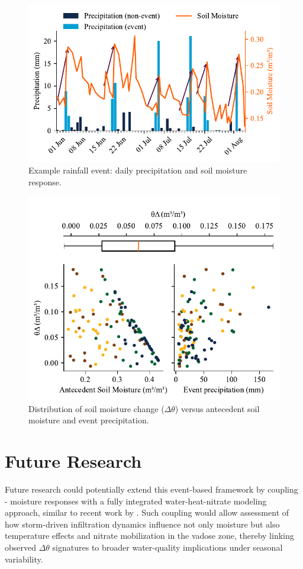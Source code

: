 \documentclass[8pt, twocolumn]{extarticle}
\begin{document}
\begin{figure}[!htbp]
    \centering
    \includegraphics[width=\columnwidth]{sample events}
    \caption{Example rainfall event: daily precipitation and soil moisture response.}
    \label{fig:sample_events}
\end{figure}

\begin{figure}[!htbp]
    \centering
    \includegraphics[width=\columnwidth]{dt events}
    \caption{Distribution of soil moisture change ($\Delta \theta$) versus antecedent soil moisture and event precipitation.}
    \label{fig:dt_events}
\end{figure}


\section{Future Research}

Future research could potentially extend this event-based framework by coupling - moisture responses with a fully integrated water-heat-nitrate modeling approach, similar to recent work by \textcite{Fahs2025}. Such coupling would allow assessment of how storm-driven infiltration dynamics influence not only moisture but also temperature effects and nitrate mobilization in the vadose zone, thereby linking observed $\Delta \theta$ signatures to broader water-quality implications under seasonal variability.

\printbibliography
\end{document}
